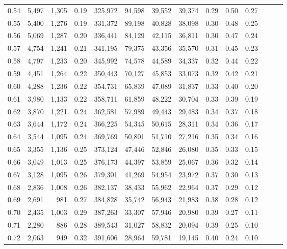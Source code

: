 \begin{tabular}{rrrrrrrrrrrrrr}
0.54 &  5,497 &  1,305 &  0.19 &  325,972 &   94,598 &  39,552 &  39,374 &  0.29 &  0.50 &      0.27 \\
0.55 &  5,400 &  1,276 &  0.19 &  331,372 &   89,198 &  40,828 &  38,098 &  0.30 &  0.48 &      0.25 \\
0.56 &  5,069 &  1,287 &  0.20 &  336,441 &   84,129 &  42,115 &  36,811 &  0.30 &  0.47 &      0.24 \\
0.57 &  4,754 &  1,241 &  0.21 &  341,195 &   79,375 &  43,356 &  35,570 &  0.31 &  0.45 &      0.23 \\
0.58 &  4,797 &  1,233 &  0.20 &  345,992 &   74,578 &  44,589 &  34,337 &  0.32 &  0.44 &      0.22 \\
0.59 &  4,451 &  1,264 &  0.22 &  350,443 &   70,127 &  45,853 &  33,073 &  0.32 &  0.42 &      0.21 \\
0.60 &  4,288 &  1,236 &  0.22 &  354,731 &   65,839 &  47,089 &  31,837 &  0.33 &  0.40 &      0.20 \\
0.61 &  3,980 &  1,133 &  0.22 &  358,711 &   61,859 &  48,222 &  30,704 &  0.33 &  0.39 &      0.19 \\
0.62 &  3,870 &  1,221 &  0.24 &  362,581 &   57,989 &  49,443 &  29,483 &  0.34 &  0.37 &      0.18 \\
0.63 &  3,644 &  1,172 &  0.24 &  366,225 &   54,345 &  50,615 &  28,311 &  0.34 &  0.36 &      0.17 \\
0.64 &  3,544 &  1,095 &  0.24 &  369,769 &   50,801 &  51,710 &  27,216 &  0.35 &  0.34 &      0.16 \\
0.65 &  3,355 &  1,136 &  0.25 &  373,124 &   47,446 &  52,846 &  26,080 &  0.35 &  0.33 &      0.15 \\
0.66 &  3,049 &  1,013 &  0.25 &  376,173 &   44,397 &  53,859 &  25,067 &  0.36 &  0.32 &      0.14 \\
0.67 &  3,128 &  1,095 &  0.26 &  379,301 &   41,269 &  54,954 &  23,972 &  0.37 &  0.30 &      0.13 \\
0.68 &  2,836 &  1,008 &  0.26 &  382,137 &   38,433 &  55,962 &  22,964 &  0.37 &  0.29 &      0.12 \\
0.69 &  2,691 &    981 &  0.27 &  384,828 &   35,742 &  56,943 &  21,983 &  0.38 &  0.28 &      0.12 \\
0.70 &  2,435 &  1,003 &  0.29 &  387,263 &   33,307 &  57,946 &  20,980 &  0.39 &  0.27 &      0.11 \\
0.71 &  2,280 &    886 &  0.28 &  389,543 &   31,027 &  58,832 &  20,094 &  0.39 &  0.25 &      0.10 \\
0.72 &  2,063 &    949 &  0.32 &  391,606 &   28,964 &  59,781 &  19,145 &  0.40 &  0.24 &      0.10 \\

\end{tabular}
